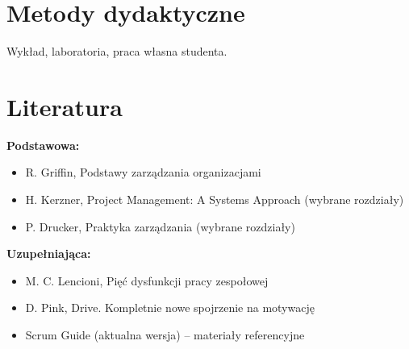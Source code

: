 \documentclass[12pt, a4paper]{article}
\begin{document}
\section{Metody dydaktyczne}

Wykład, laboratoria, praca własna studenta.

\section{Literatura}

\textbf{Podstawowa:}
\begin{itemize}
  \item R. Griffin, Podstawy zarządzania organizacjami
  \item H. Kerzner, Project Management: A Systems Approach (wybrane rozdziały)
  \item P. Drucker, Praktyka zarządzania (wybrane rozdziały)
\end{itemize}

\textbf{Uzupełniająca:}
\begin{itemize}
  \item M. C. Lencioni, Pięć dysfunkcji pracy zespołowej
  \item D. Pink, Drive. Kompletnie nowe spojrzenie na motywację
  \item Scrum Guide (aktualna wersja) – materiały referencyjne
\end{itemize}
\end{document}
